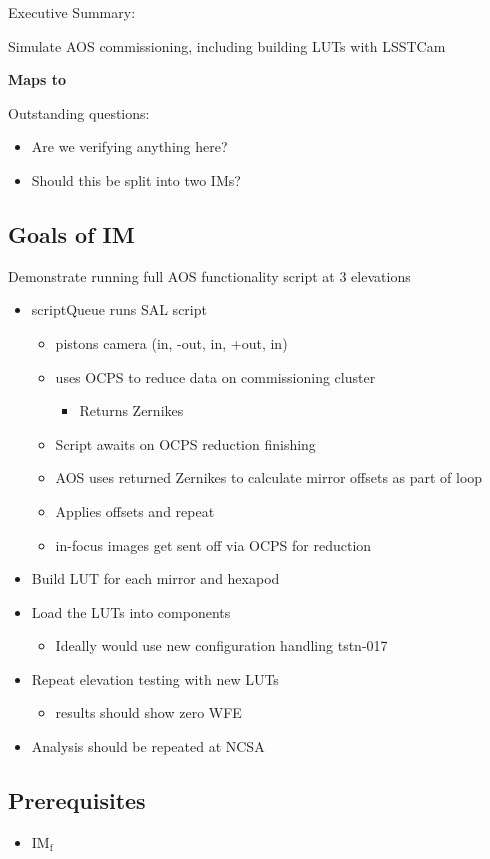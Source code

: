 
Executive Summary:

Simulate AOS commissioning, including building LUTs with LSSTCam

\textbf{Maps to }

Outstanding questions:
\begin{itemize}
\item Are we verifying anything here?
\item Should this be split into two IMs?
\end{itemize}

\subsection{Goals of IM}
Demonstrate running full AOS functionality script at 3 elevations
\begin{itemize}
\item scriptQueue runs SAL script
  \begin{itemize}
  \item pistons camera (in, -out, in, +out, in)
  \item uses \gls{OCPS} to reduce data on commissioning cluster
    \begin{itemize}
    \item Returns Zernikes
    \end{itemize}
  \item Script awaits on \gls{OCPS} reduction finishing
  \item AOS uses returned Zernikes to calculate mirror offsets as part of loop
  \item Applies offsets and repeat
  \item in-focus images get sent off via \gls{OCPS} for reduction
  \end{itemize}
\end{itemize}
\begin{itemize}
\item Build LUT for each mirror and hexapod
\item Load the LUTs into components
  \begin{itemize}
  \item Ideally would use new configuration handling tstn-017
  \end{itemize}
\item Repeat elevation testing with new LUTs
  \begin{itemize}
  \item results should show zero WFE
  \end{itemize}
\item Analysis should be repeated at NCSA
\end{itemize}

\subsection{Prerequisites}
\begin{itemize}
\item IM\(_{\text{f}}\)
\end{itemize}
